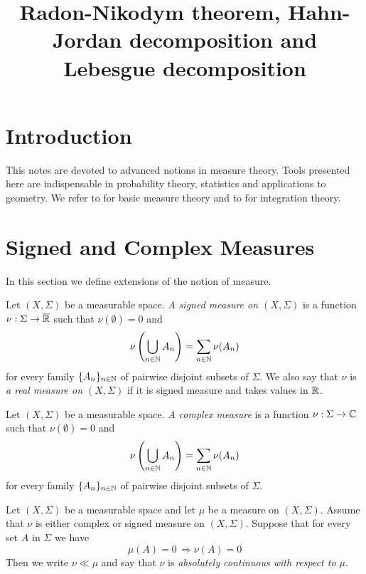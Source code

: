 



\title{Radon-Nikodym theorem, Hahn-Jordan decomposition and Lebesgue decomposition}
\date{}
\maketitle

\section{Introduction}
\noindent
This notes are devoted to advanced notions in measure theory. Tools presented here are indispensable in probability theory, statistics and applications to geometry. We refer to \cite{Introduction_to_measure_theory} for basic measure theory and to \cite{Integration} for integration theory.

\section{Signed and Complex Measures}
\noindent
In this section we define extensions of the notion of measure. 

\begin{definition}
Let $\left(X,\Sigma\right)$ be a measurable space. \textit{A signed measure on $(X,\Sigma)$} is a function $\nu:\Sigma\rightarrow \overline{{\mathbb R}}$ such that $\nu(\emptyset)=0$ and 
$$\nu\left(\bigcup_{n\in {\mathbb N}}A_n\right)=\sum_{n\in {\mathbb N}}\nu(A_n)$$
for every family $\{A_n\}_{n\in {\mathbb N}}$ of pairwise disjoint subsets of $\Sigma$. We also say that $\nu$ is \textit{a real measure on $(X,\Sigma)$} if it is signed measure and takes values in ${\mathbb R}$.
\end{definition}

\begin{definition}
Let $\left(X,\Sigma\right)$ be a measurable space. \textit{A complex measure} is a function $\nu:\Sigma\rightarrow {\mathbb C}$ such that $\nu(\emptyset)=0$ and 
$$\nu\left(\bigcup_{n\in {\mathbb N}}A_n\right)=\sum_{n\in {\mathbb N}}\nu(A_n)$$
for every family $\{A_n\}_{n\in {\mathbb N}}$ of pairwise disjoint subsets of $\Sigma$. 
\end{definition}

\begin{definition}
Let $(X,\Sigma)$ be a measurable space and let $\mu$ be a measure on $(X,\Sigma)$. Assume that $\nu$ is either complex or signed measure on $(X,\Sigma)$. Suppose that for every set $A$ in $\Sigma$ we have
$$\mu(A) = 0\,\Rightarrow \nu(A)=0$$
Then we write $\nu \ll \mu$ and say that $\nu$ is \textit{absolutely continuous with respect to $\mu$}.
\end{definition}

